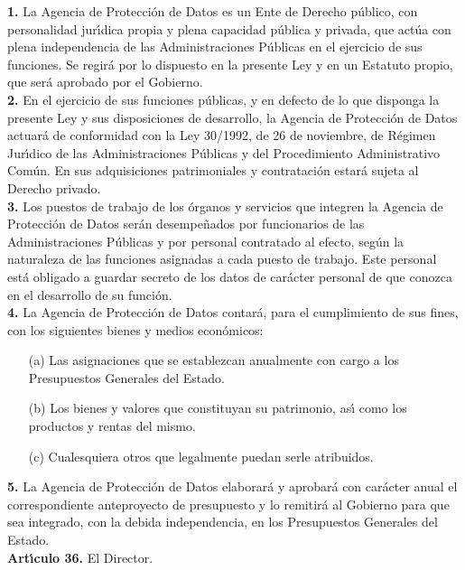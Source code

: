 {\bf 1.} La Agencia de Protecci\'on de Datos es un Ente de Derecho p\'ublico,
con personalidad jur\'{\i}dica propia y plena capacidad p\'ublica y privada, 
que act\'ua con plena independencia de las Administraciones P\'ublicas en 
el ejercicio de sus funciones. Se regir\'a por lo dispuesto en la presente Ley 
y en un Estatuto propio, que ser\'a aprobado por el Gobierno.\\

{\bf 2.} En el ejercicio de sus funciones p\'ublicas, y en defecto de lo que 
disponga la presente Ley y sus disposiciones de desarrollo, la Agencia de 
Protecci\'on de Datos actuar\'a de conformidad con la Ley 30/1992, de 26 de 
noviembre, de R\'egimen Jur\'{\i}dico de las Administraciones P\'ublicas y del 
Procedimiento Administrativo Com\'un. En sus adquisiciones patrimoniales y 
contrataci\'on estar\'a sujeta al Derecho privado.\\

{\bf 3.} Los puestos de trabajo de los \'organos y servicios que integren la 
Agencia de Protecci\'on de Datos ser\'an desempe\~nados por funcionarios de las 
Administraciones P\'ublicas y por personal contratado al efecto, seg\'un la 
naturaleza de las funciones asignadas a cada puesto de trabajo. Este personal 
est\'a obligado a guardar secreto de los datos de car\'acter personal de que 
conozca en el desarrollo de su funci\'on.\\

{\bf 4.} La Agencia de Protecci\'on de Datos contar\'a, para el cumplimiento de 
sus fines, con los siguientes bienes y medios econ\'omicos:
\begin{itemize}
\item [(a)] Las asignaciones que se establezcan anualmente con cargo a los 
Presupuestos Generales del Estado.
\item [(b)] Los bienes y valores que constituyan su patrimonio, as\'{\i} como 
los productos y rentas del mismo.
\item [(c)] Cualesquiera otros que legalmente puedan serle atribuidos.
\end{itemize}

{\bf 5.} La Agencia de Protecci\'on de Datos elaborar\'a y aprobar\'a con 
car\'acter anual el correspondiente anteproyecto de presupuesto y lo remitir\'a 
al Gobierno para que sea integrado, con la debida independencia, en los 
Presupuestos Generales del Estado.
\vspace{0.3cm}\\
{\large {\bf Art\'{\i}culo 36.} El Director.}

